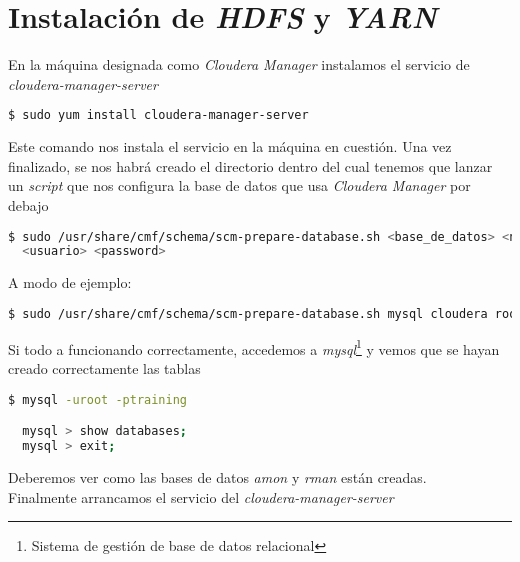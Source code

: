 \clearpage

\section{Instalación de \textit{HDFS} y \textit{YARN}}\label{sec:instalacion_hdfs_yarn}

En la máquina designada como \textit{Cloudera Manager} instalamos el servicio de \textit{cloudera-manager-server}

\begin{lstlisting}[language=bash, numbers=none]
$ sudo yum install cloudera-manager-server
\end{lstlisting}

Este comando nos instala el servicio en la máquina en cuestión. Una vez finalizado, se nos habrá creado el
directorio  dentro del cual tenemos que lanzar un \textit{script} que nos configura la base de 
datos que usa \textit{Cloudera Manager} por debajo

\begin{lstlisting}[language=bash, numbers=none]
$ sudo /usr/share/cmf/schema/scm-prepare-database.sh <base_de_datos> <nombre_db> \
  <usuario> <password>
\end{lstlisting}

A modo de ejemplo:


\begin{lstlisting}[language=bash, numbers=none]
$ sudo /usr/share/cmf/schema/scm-prepare-database.sh mysql cloudera root training
\end{lstlisting}

Si todo a funcionando correctamente, accedemos a \textit{mysql}\footnote{Sistema de gestión de base de datos relacional} y vemos que se hayan creado correctamente las tablas

\begin{lstlisting}[language=bash, numbers=none]
$ mysql -uroot -ptraining

  mysql > show databases;
  mysql > exit;
\end{lstlisting}

Deberemos ver como las bases de datos \textit{amon} y \textit{rman} están creadas.\\
Finalmente arrancamos el servicio del \textit{cloudera-manager-server}

